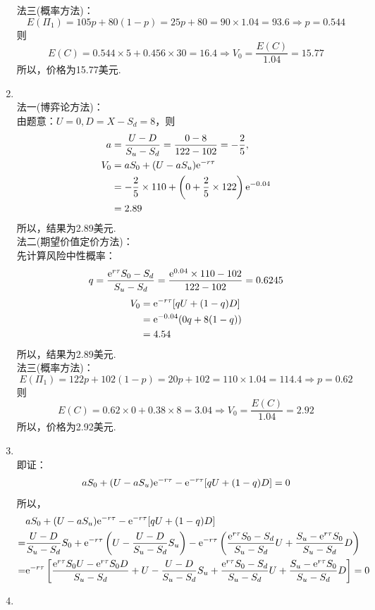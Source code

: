 \begin{enumerate}
    法三(概率方法)：
    \[E(\Pi_1) = 105p + 80(1-p) = 25p+80 = 90 \times 1.04 = 93.6 \Rightarrow p = 0.544\]
    则
    \[E(C) = 0.544 \times 5 + 0.456 \times 30 = 16.4 \Rightarrow V_0 = \frac{E(C)}{1.04} = 15.77\]
    所以，价格为15.77美元.
    \item \sol\\
    法一(博弈论方法)：\\
    由题意：$U=0,D=X-S_d=8$，则
    \begin{align*}
        a & = \frac{U-D}{S_u-S_d} = \frac{0-8}{122-102}=-\frac{2}{5},\\
        V_0 & = aS_0 + (U-aS_u)\mathrm{e}^{-r\tau}\\
        & = -\frac{2}{5} \times 110 + \left(0+\frac{2}{5} \times 122\right)\mathrm{e}^{-0.04}\\
        & = 2.89
    \end{align*}
    所以，结果为2.89美元.\\
    法二(期望价值定价方法)：\\
    先计算风险中性概率：\[q = \frac{\mathrm{e}^{r\tau}S_0 - S_d}{S_u - S_d} = \frac{\mathrm{e}^{0.04} \times 110 - 102}{122-102} = 0.6245\]
    \begin{align*}
        V_0 & = \mathrm{e}^{-r\tau}[qU+(1-q)D]\\
        & = \mathrm{e}^{-0.04}(0q+8(1-q))\\
        & = 4.54
    \end{align*}
    所以，结果为2.89美元.\\
    法三(概率方法)：
    \[E(\Pi_1) = 122p + 102(1-p) = 20p+102 = 110 \times 1.04 = 114.4 \Rightarrow p = 0.62\]
    则
    \[E(C) = 0.62 \times 0 + 0.38 \times 8 = 3.04 \Rightarrow V_0 = \frac{E(C)}{1.04} = 2.92\]
    所以，价格为2.92美元.
    \item \pro\\
    即证：
    \[aS_0 + (U-aS_u)\mathrm{e}^{-r\tau} - \mathrm{e}^{-r\tau}[qU+(1-q)D] = 0\]
    所以，
    \begin{align*}
        & aS_0 + (U-aS_u)\mathrm{e}^{-r\tau} - \mathrm{e}^{-r\tau}[qU+(1-q)D]\\
        = & \frac{U-D}{S_u-S_d}S_0 + \mathrm{e}^{-r\tau}\left(U-\frac{U-D}{S_u-S_d}S_u\right) - \mathrm{e}^{-r\tau}\left(\frac{\mathrm{e}^{r\tau}S_0 - S_d}{S_u - S_d} U + \frac{S_u - \mathrm{e}^{r\tau}S_0}{S_u - S_d}D\right)\\
        = & \mathrm{e}^{-r\tau} \left[\frac{\mathrm{e}^{r\tau}S_0U-\mathrm{e}^{r\tau}S_0D}{S_u - S_d} + U-\frac{U-D}{S_u-S_d}S_u + \frac{\mathrm{e}^{r\tau}S_0 - S_d}{S_u - S_d} U + \frac{S_u - \mathrm{e}^{r\tau}S_0}{S_u - S_d}D\right] = 0
    \end{align*}
    \item \omitted

\end{enumerate}
